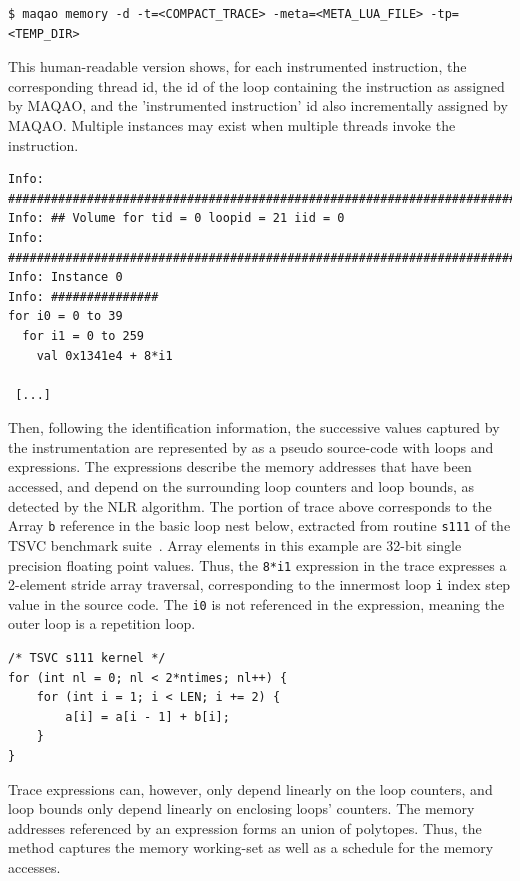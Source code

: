 \documentclass[11pt, a4paper, twoside]{montblanc2}
\begin{document}
\begin{verbatim}
$ maqao memory -d -t=<COMPACT_TRACE> -meta=<META_LUA_FILE> -tp=<TEMP_DIR>
\end{verbatim}

This human-readable version shows, for each instrumented instruction, the
corresponding thread id, the id of the loop containing the instruction as
assigned by MAQAO, and the 'instrumented instruction' id also incrementally
assigned by MAQAO. Multiple instances may exist when multiple threads invoke
the instruction.

\begin{footnotesize}
\begin{verbatim}
Info: ################################################################################
Info: ## Volume for tid = 0 loopid = 21 iid = 0
Info: ################################################################################
Info: Instance 0
Info: ###############
for i0 = 0 to 39
  for i1 = 0 to 259
    val 0x1341e4 + 8*i1

 [...]
\end{verbatim}
\end{footnotesize}

Then, following the identification information, the successive values captured
by the instrumentation are represented by as a pseudo source-code with loops and
expressions. The expressions describe the memory addresses that have been
accessed, and depend on the surrounding loop counters and loop bounds, as
detected by the NLR algorithm. The portion of trace above corresponds to the
Array \texttt{b} reference in the basic loop nest below, extracted from routine
\texttt{s111} of the TSVC benchmark
suite~\cite{maleki:vectorization:pact:2011,callahan:tsvc:sc:1988}. Array
elements in this example are 32-bit single precision floating point values. Thus, the
\texttt{8*i1} expression in the trace expresses a 2-element stride array
traversal, corresponding to the innermost loop \texttt{i} index step value in the
source code. The \texttt{i0} is not referenced in the expression, meaning the
outer loop is a repetition loop.

\lstset{style=C}
\begin{lstlisting}
/* TSVC s111 kernel */
for (int nl = 0; nl < 2*ntimes; nl++) {
	for (int i = 1; i < LEN; i += 2) {
		a[i] = a[i - 1] + b[i];
	}
}
\end{lstlisting}

Trace expressions can, however, only depend linearly on the loop counters, and
loop bounds only depend linearly on enclosing loops' counters. The memory
addresses referenced by an expression forms an union of polytopes. Thus, the
method captures the memory working-set as well as a schedule for the memory
accesses.
\end{document}
